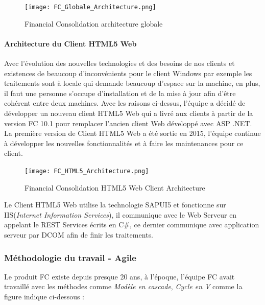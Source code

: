    \begin{figure}[H]
        \centering
        \texttt{[image: FC\_Globale\_Architecture.png]}
        \caption{Financial Consolidation architecture globale}
        \label{fig:FC_architecture_label}
    \end{figure}
    
    \paragraph{Architecture du Client HTML5 Web}
    Avec l'évolution des nouvelles technologies et des besoins de nos clients et existences de beaucoup d’inconvénients pour le client Windows par exemple les traitements sont à locale qui demande beaucoup d'espace sur la machine, en plus, il faut une personne  s'occupe d'installation et de la mise à jour afin d'être cohérent entre deux machines. Avec les raisons ci-dessus, l'équipe a décidé de développer un nouveau client HTML5 Web qui a livré aux clients à partir de la version FC 10.1 pour remplacer l'ancien client Web développé avec ASP .NET. La première version de Client HTML5 Web a été sortie en 2015, l'équipe continue à développer les nouvelles fonctionnalités et à faire les maintenances pour ce client.
    
    \begin{figure}[H]
        \centering
        \texttt{[image: FC\_HTML5\_Architecture.png]}
        \caption{Financial Consolidation HTML5 Web Client Architecture}
        \label{fig:FC_HTML5_Architecture_label}
    \end{figure}
    
    \par Le Client HTML5 Web utilise la technologie SAPUI5 et fonctionne sur IIS(\textit{Internet Information Services}), il communique avec le Web Serveur en appelant le REST Services écrits en C\#, ce dernier communique avec application serveur par DCOM afin de finir les traitements.
    
    \newpage
    \subsubsection{Méthodologie du travail - Agile}
    Le produit FC existe depuis presque 20 ans, à l'époque, l'équipe FC avait travaillé avec les méthodes comme \textit{Modèle en cascade}, \textit{Cycle en V} comme la figure indique ci-dessous : 
    
